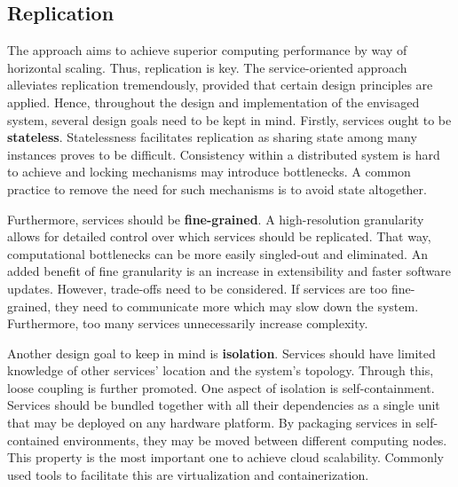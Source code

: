 \subsection{Replication}
The approach aims to achieve superior computing performance by way of horizontal scaling. Thus, replication is key. 
The service-oriented approach alleviates replication tremendously, provided that certain design principles are applied. Hence, throughout the design and implementation of the envisaged system, several design goals need to be kept in mind. Firstly, services ought to be \textbf{stateless}. Statelessness facilitates replication as sharing state among many instances proves to be difficult. Consistency within a distributed system is hard to achieve and locking mechanisms may introduce bottlenecks. A common practice to remove the need for such mechanisms is to avoid state altogether. 

Furthermore, services should be \textbf{fine-grained}. A high-resolution granularity allows for detailed control over which services should be replicated. That way, computational bottlenecks can be more easily singled-out and eliminated. An added benefit of fine granularity is an increase in extensibility and faster software updates. However, trade-offs need to be considered. If services are too fine-grained, they need to communicate more which may slow down the system. Furthermore, too many services unnecessarily increase complexity.

Another design goal to keep in mind is \textbf{isolation}. Services should have limited knowledge of other services' location and the system's topology. Through this, loose coupling is further promoted. One aspect of isolation is self-containment. Services should be bundled together with all their dependencies as a single unit that may be deployed on any hardware platform. By packaging services in self-contained environments, they may be moved between different computing nodes. This property is the most important one to achieve cloud scalability. Commonly used tools to facilitate this are virtualization and containerization.

